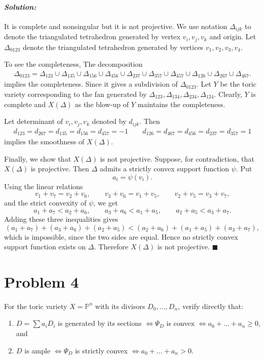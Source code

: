 \documentclass[12pt, a4paper]{article}
\newenvironment{solution}
  {\paragraph{\textit{Solution:}}\par\medskip}
  {\hfill$\blacksquare$\vspace{0.1cm}}
\begin{document}
\begin{solution}
    It is complete and nonsingular but it is not projective. 
    We use notation $\Delta_{ijk}$ to denote the triangulated tetrahedron generated by vertex $v_i,v_j,v_k$ and origin. Let $\Delta_{0123}$ denote the triangulated tetrahedron generated by vertices $v_1,v_2,v_3,v_4$.

    To see the completeness, The decomposition 
    \begin{align*}
        \Delta_{0123} = \Delta_{123}\cup \Delta_{135}\cup \Delta_{156}\cup\Delta_{456}\cup\Delta_{237}\cup\Delta_{357}\cup\Delta_{457}\cup\Delta_{126}\cup\Delta_{267}\cup\Delta_{467}.
    \end{align*}
    implies the completeness. Since it gives a subdivision of $\Delta_{0123}$. Let $Y$ be the toric variety corresponding to the fan generated by $\Delta_{123},\Delta_{134},\Delta_{234},\Delta_{124}$. 
    Clearly, $Y$ is complete and $X(\Delta)$ as the blow-up of $Y$ maintains the completeness.
   
    
    Let determinant of $v_i,v_j,v_k$ denoted by $d_{ijk}$. Then 
    \begin{align*}
        d_{123}=d_{267}=d_{135}=d_{156}=d_{457} = -1 \qquad d_{126}=d_{467}=d_{456}=d_{237}=d_{357}=1
    \end{align*}
    implies the smoothness of $X(\Delta)$.

    Finally, we show that \(X(\Delta)\) is not projective. Suppose, for contradiction, that \(X(\Delta)\) is projective. Then \(\Delta\) admits a strictly convex support function \(\psi\). Put
\[
a_i=\psi(v_i).
\]
Using the linear relations
\[
v_1+v_7=v_2+v_6,
\qquad
v_3+v_6=v_1+v_5,
\qquad
v_2+v_5=v_3+v_7,
\]
and the strict convexity of \(\psi\), we get
\[
a_1+a_7<a_2+a_6,
\qquad 
a_3+a_6<a_1+a_5,
\qquad 
a_2+a_5<a_3+a_7.
\]
Adding these three inequalities gives
\[
(a_1+a_7)+(a_3+a_6)+(a_2+a_5)
<
(a_2+a_6)+(a_1+a_5)+(a_3+a_7),
\]
which is impossible, since the two sides are equal. Hence no strictly convex support function exists on \(\Delta\). Therefore \(X(\Delta)\) is not projective.
\end{solution}


\section*{Problem 4}
For the toric variety $X=\mathbb{P}^{n}$ with its divisors $D_{0},\dots,D_{n}$, verify directly that:
\begin{enumerate}
    \item $D=\sum a_{i}D_{i}$ is generated by its sections $\iff \Psi_{D}$ is convex $\iff a_{0}+\dots+a_{n}\ge0$, and 
    \item $D$ is ample $\iff \Psi_{D}$ is strictly convex $\iff a_{0}+\dots+a_{n}>0$.
\end{enumerate}
\end{document}
